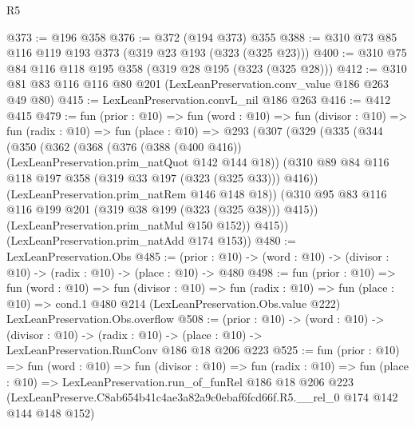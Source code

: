 \begin{lexlean}{R5}
\begin{coremodule}
@373 := @196 @358
@376 := @372 (@194 @373) @355
@388 := @310 @73 @85 @116 @119 @193 @373 (@319 @23 @193 (@323 (@325 @23)))
@400 := @310 @75 @84 @116 @118 @195 @358 (@319 @28 @195 (@323 (@325 @28)))
@412 := @310 @81 @83 @116 @116 @80 @201 (LexLeanPreservation.conv_value @186 @263 @49 @80)
@415 := LexLeanPreservation.convL_nil @186 @263
@416 := @412 @415
@479 := fun (prior : @10) =>
  fun (word : @10) =>
  fun (divisor : @10) =>
  fun (radix : @10) =>
  fun (place : @10) =>
  @293
    (@307
      (@329
        (@335
          (@344
            (@350
              (@362
                (@368
                  (@376 (@388 (@400 @416)) (LexLeanPreservation.prim_natQuot @142 @144 @18))
                  (@310 @89 @84 @116 @118 @197 @358 (@319 @33 @197 (@323 (@325 @33))) @416))
                (LexLeanPreservation.prim_natRem @146 @148 @18))
              (@310 @95 @83 @116 @116 @199 @201 (@319 @38 @199 (@323 (@325 @38))) @415))
            (LexLeanPreservation.prim_natMul @150 @152))
          @415))
      (LexLeanPreservation.prim_natAdd @174 @153))
@480 := LexLeanPreservation.Obs
@485 := (prior : @10) -> (word : @10) -> (divisor : @10) -> (radix : @10) -> (place : @10) -> @480
@498 := fun (prior : @10) =>
  fun (word : @10) =>
  fun (divisor : @10) =>
  fun (radix : @10) =>
  fun (place : @10) =>
  cond.{1} @480 @214 (LexLeanPreservation.Obs.value @222) LexLeanPreservation.Obs.overflow
@508 := (prior : @10) ->
  (word : @10) ->
  (divisor : @10) ->
  (radix : @10) -> (place : @10) -> LexLeanPreservation.RunConv @186 @18 @206 @223
@525 := fun (prior : @10) =>
  fun (word : @10) =>
  fun (divisor : @10) =>
  fun (radix : @10) =>
  fun (place : @10) =>
  LexLeanPreservation.run_of_funRel
    @186
    @18
    @206
    @223
    (LexLeanPreserve.C8ab654b41c4ae3a82a9c0ebaf6fcd66f.R5.__rel_0 @174 @142 @144 @148 @152)
\end{coremodule}
\end{lexlean}
